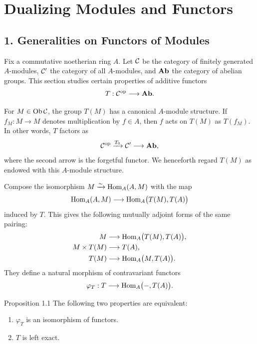 
\makeatletter
\providecommand{\sgareaderlabel}[2]{%
  \begingroup
  \def\@currentlabel{#2}%
  \phantomsection\label{#1}%
  \endgroup}
\makeatother

\chapter{Dualizing Modules and Functors}
\label{IV}
\section*{1. Generalities on Functors of Modules}
\sgareaderlabel{IV.1}{1}

Fix\sgareaderlabel{pIV.1}{1} a commutative noetherian ring $A$. Let $\mathcal C$ be the
category of finitely generated $A$-modules, $\mathcal C'$ the category of all
$A$-modules, and $\mathbf{Ab}$ the category of abelian groups. This section studies
certain properties of additive functors
\[
  T:\mathcal C^{\mathrm{op}}\longrightarrow\mathbf{Ab}.
\]

For $M\in\operatorname{Ob}\mathcal C$, the group $T(M)$ has a canonical $A$-module structure.
If $f_M:M\to M$ denotes multiplication by $f\in A$, then $f$ acts on $T(M)$
as $T(f_M)$. In other words, $T$ factors as
\[
  \mathcal C^{\mathrm{op}}\xrightarrow{T_0}\mathcal C'
  \longrightarrow\mathbf{Ab},
\]
where the second arrow is the forgetful functor. We henceforth regard
$T(M)$ as endowed with this $A$-module structure.

Compose the isomorphism $M\xrightarrow{\sim}\operatorname{Hom}_A(A,M)$ with the map
\[
  \operatorname{Hom}_A(A,M)\longrightarrow\operatorname{Hom}_A\bigl(T(M),T(A)\bigr)
\]
induced by $T$. This gives the following mutually adjoint forms of the same
pairing:
\begin{align*}
  M&\longrightarrow\operatorname{Hom}_A\bigl(T(M),T(A)\bigr),\\
  M\times T(M)&\longrightarrow T(A),\\
  T(M)&\longrightarrow\operatorname{Hom}_A\bigl(M,T(A)\bigr).
\end{align*}
They define a natural morphism of contravariant functors
\[
  \varphi_T:T\longrightarrow\operatorname{Hom}_A\bigl(-,T(A)\bigr).
\]

\begin{sgastatement}{Proposition 1.1}\sgareaderlabel{IV.1.1}{1.1}
The following two properties are equivalent:
\begin{enumerate}[label=\textup{\roman*)},leftmargin=2.7em]
\item $\varphi_T$ is an isomorphism of functors.
\item $T$ is left exact.
\end{enumerate}
\end{sgastatement}

